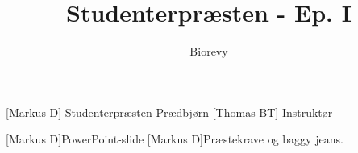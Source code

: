 \documentclass[a4paper,12pt]{article}
\title{Studenterpræsten - Ep. I}
\author{Biorevy}
\begin{document}
\maketitle




\begin{roles}
	[Markus D] Studenterpræsten Prædbjørn
	[Thomas BT] Instruktør
\end{roles}


\begin{props}
	[Markus D]PowerPoint-slide
	[Markus D]Præstekrave og baggy jeans.
\end{props}
\end{document}
